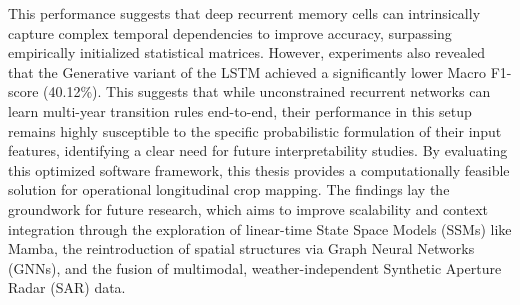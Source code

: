 This performance suggests that deep recurrent memory cells can intrinsically capture complex
temporal dependencies to improve accuracy, surpassing empirically initialized statistical matrices.
However, experiments also revealed that the Generative variant of the LSTM achieved a significantly lower Macro F1-score (40.12\%). 
This suggests that while unconstrained recurrent networks can learn multi-year transition rules end-to-end,
their performance in this setup remains highly susceptible to the specific probabilistic formulation of their input features,
identifying a clear need for future interpretability studies.
By evaluating this optimized software framework, this thesis provides a computationally
feasible solution for operational longitudinal crop mapping.
The findings lay the groundwork for future research, which aims to improve scalability
and context integration through the exploration of linear-time State Space Models (SSMs) like Mamba,
the reintroduction of spatial structures via Graph Neural Networks (GNNs),
and the fusion of multimodal, weather-independent Synthetic Aperture Radar (SAR) data.